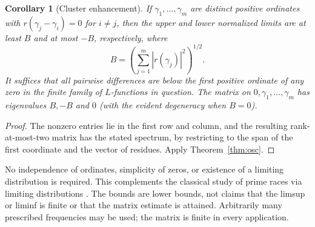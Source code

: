 \documentclass[11pt]{article}
\newtheorem{corollary}[theorem]{Corollary}
\theoremstyle{definition}\newtheorem{definition}[theorem]{Definition}
\begin{document}
\begin{corollary}[Cluster enhancement]\label{cor:cluster}
If $\gamma_1,\ldots,\gamma_m$ are distinct positive ordinates with $r(\gamma_j-\gamma_i)=0$ for $i\ne j$, then the upper and lower normalized limits are at least $B$ and at most $-B$, respectively, where
\[
 B=\left(\sum_{j=1}^m |r(\gamma_j)|^2\right)^{1/2}.
\]
It suffices that all pairwise differences are below the first positive ordinate of any zero in the finite family of $L$-functions in question. The matrix on $0,\gamma_1,\ldots,\gamma_m$ has eigenvalues $B,-B$ and $0$ (with the evident degeneracy when $B=0$).
\end{corollary}
\begin{proof}
The nonzero entries lie in the first row and column, and the resulting rank-at-most-two matrix has the stated spectrum, by restricting to the span of the first coordinate and the vector of residues. Apply Theorem~\ref{thm:osc}.
\end{proof}
No independence of ordinates, simplicity of zeros, or existence of a limiting distribution is required. This complements the classical study of prime races via limiting distributions \cite{rs}. The bounds are lower bounds, not claims that the limsup or liminf is finite or that the matrix estimate is attained. Arbitrarily many prescribed frequencies may be used; the matrix is finite in every application.
\end{document}

